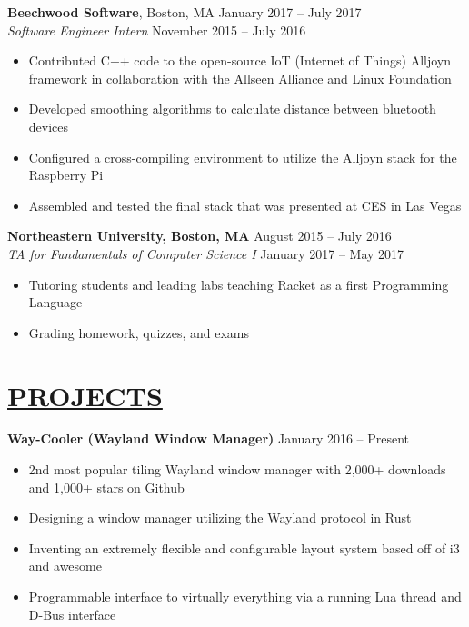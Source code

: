\documentclass[overlapped,line]{res}
\begin{document}
\begin{resume}
\textbf{Beechwood Software}, Boston, MA \hfill January 2017 \--- July 2017\\
                 {\sl Software Engineer Intern} \hfill November 2015 \--- July 2016 
                 \begin{itemize}  \itemsep -2pt
                 \item Contributed C++ code to the open-source IoT (Internet of Things) Alljoyn framework in collaboration with the Allseen Alliance and Linux Foundation 
                 \item Developed smoothing algorithms to calculate distance between bluetooth devices 
                 \item Configured a cross-compiling environment to utilize the Alljoyn stack for the Raspberry Pi 
                 \item Assembled and tested the final stack that was presented at CES in Las Vegas
                \end{itemize}
\textbf{Northeastern University, Boston, MA } \hfill August 2015 \--- July 2016 \\ 
              	{\sl TA for Fundamentals of Computer Science I} \hfill January 2017 \--- May 2017
              	\begin{itemize} \itemsep -2pt
              	\item  Tutoring students and leading labs teaching Racket as a first Programming Language
              	\item Grading homework, quizzes, and exams  \vspace{-1em}
              	\end{itemize}
\noindent\makebox[7.15in]{\rule{7.15in}{0.4pt}}
\section{\underline{PROJECTS}}
\textbf{Way-Cooler (Wayland Window Manager)} \hfill January 2016 \--- Present
				\begin{itemize}  \itemsep -2pt
				\item 2nd most popular tiling Wayland window manager with 2,000+ downloads and 1,000+ stars on Github
				\item Designing a window manager utilizing the Wayland protocol in Rust
				\item Inventing an extremely flexible and configurable layout system based off of i3 and awesome
				\item Programmable interface to virtually everything via a running Lua thread and D-Bus interface
				\end{itemize}


\end{resume}
\end{document}
